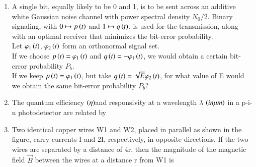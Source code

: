 \documentclass[a4paper, 11pt]{article}
\begin{document}
\begin{enumerate}
    \hfill{}
    
    \item A single bit, equally likely to be 0 and 1, is to be sent across an additive white Gaussian noise  channel with power spectral density $N_{0}/2$. Binary signaling, with $0\mapsto p\left(t\right)$ and $1\mapsto q\left(t\right)$, is used for the transmission, along with an optimal receiver that minimizes the bit-error probability.\\Let $\varphi_{1}\left(t\right)$, $\varphi_{2}\left(t\right)$ form an orthonormal signal set.\\If we choose $p\left(t\right)=\varphi_{1}\left(t\right)$ and $q\left(t\right)=-\varphi_{1}\left(t\right)$, we would obtain a certain bit-error probability $P_{b}$.\\If we keep $p\left(t\right)=\varphi_{1}\left(t\right)$, but take $q\left(t\right)=\sqrt{E}\varphi_{2}\left(t\right)$, for what value of E would we obtain the same bit-error probability $P_{b}$?
    \begin{enumerate}
    \end{enumerate}
    
    \hfill{}
    
    \item The quantum efficiency $\left(\eta\right)$and responsivity  at a wavelength $\lambda$ $\left(in \mu m\right)$ in a p-i-n photodetector are related by
    \begin{enumerate}
    \end{enumerate}
    
    \hfill{}
    
    \item Two identical copper wires W1 and W2, placed in parallel as shown in the figure, carry currents I and 2I, respectively, in opposite directions. If the two wires are separated by a distance of 4r, then the magnitude of the magnetic field $\vec{B}$ between the wires at a distance r from W1 is
    

\end{enumerate}
\end{document}
